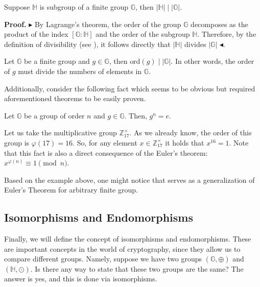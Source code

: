 \documentclass[../lecture-notes-148x210.tex]{subfiles}
\begin{document}
\begin{corollary}
    Suppose $\mathbb{H}$ is subgroup of a finite group $\mathbb{G}$, 
    then $\left| \mathbb{H} \right| \mid \left| \mathbb{G} \right|$.
\end{corollary}

\textbf{Proof.} $\blacktriangleright$ By Lagrange's theorem, the order of the group $\mathbb{G}$ 
decomposes as the product of the index $\left[ \mathbb{G} : \mathbb{H} \right]$ and the order of the 
subgroup $\mathbb{H}$. Therefore, by the definition of divisibility (see ), 
it follows directly that $\left| \mathbb{H} \right|$ divides $\left| \mathbb{G} \right|$ $\blacktriangleleft$.

\begin{corollary}
    Let $\mathbb{G}$ be a finite group and $g \in \mathbb{G}$, 
    then $\text{ord}(g) \mid \left| \mathbb{G} \right|$. In other words, the order of $g$ must 
    divide the numbers of elements in $\mathbb{G}$. 
\end{corollary}

Additionally, consider the following fact which seems to be obvious but required aforementioned 
theorems to be easily proven.

\begin{corollary}\label{corollary:group-exp}
    Let $\mathbb{G}$ be a group of order $n$ and $g \in \mathbb{G}$. Then,
    $g^{n} = e$.
\end{corollary}

\begin{example}
    Let us take the multiplicative group $\mathbb{Z}_{17}^{\times}$. As we
    already know, the order of this group is $\varphi(17) = 16$. So, for any
    element $x \in \mathbb{Z}_{17}^{\times}$ it holds that $x^{16} = 1$. Note
    that this fact is also a direct consequence of the Euler's theorem:
    $x^{\varphi(n)} \equiv 1 \pmod{n}$.
\end{example}

Based on the example above, one might notice that 
serves as a generalization of Euler's Theorem for arbitrary finite group.

\subsection{Isomorphisms and Endomorphisms}

Finally, we will define the concept of isomorphisms and endomorphisms. These are important concepts in the world of cryptography, since they allow us to compare different groups. Namely, 
suppose we have two groups $(\mathbb{G},\oplus)$ and $(\mathbb{H}, \odot)$. Is there any way to state that these two groups are the same? The answer is yes, and this is done via isomorphisms.
\end{document}
